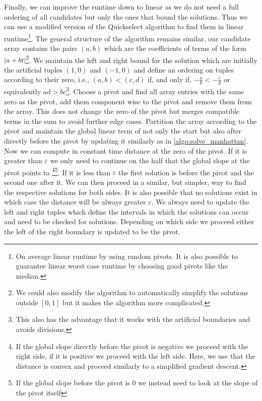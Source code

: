 Finally, we can improve the runtime down to linear as we do not need a full ordering of all candidates but only the ones that bound the solutions. Thus we can use a modified version of the Quickselect algorithm to find them in linear runtime\footnote{On average linear runtime by using random pivots. It is also possible to guarantee linear worst case runtime by choosing good pivots like the median.}. The general structure of the algorithm remains similar, our candidate array contains the pairs \((a, b)\) which are the coefficients of terms of the form \(|a+bt|\)\footnote{We could also modify the algorithm to automatically simplify the solutions outside \([0,1]\) but it makes the algorithm more complicated.}. 
We maintain the left and right bound for the solution which are initially the artificial tuples \((1, 0)\) and \((-1, 0)\) and define an ordering on tuples according to their zero, i.e., \((a, b) < (c,d)\) if, and only if, \(-\frac ab < -\frac cd\) or equivalently \(ad > bc\)\footnote{This also has the advantage that it works with the artificial boundaries and avoids divisions.}. 
Choose a pivot and find all array entries with the same zero as the pivot, add them component wise to the pivot and remove them from the array. This does not change the zero of the pivot but merges compatible terms in the sum to avoid further edge cases. Partition the array according to the pivot and maintain the global linear term of not only the start but also after directly before the pivot by updating it similarly as in \cref{algo:solve_manhattan}. Now we can compute in constant time distance at the zero of the pivot. If it is greater than \(\varepsilon\) we only need to continue on the half that the global slope at the pivot points to \footnote{If the global slope directly before the pivot is negative we proceed with the right side, if it is positive we proceed with the left side. Here, we use that the distance is convex and proceed similarly to a simplified gradient descent. }\footnote{If the global slope before the pivot is 0 we instead need to look at the slope of the pivot itself}. If it is less than \(\varepsilon\) the first solution is before the pivot and the second one after it. We can then proceed in a similar, but simpler, way to find the respective solutions for both sides. It is also possible that no solutions exist in which case the distance will be always greater \(\varepsilon\). We always need to update the left and right tuples which define the intervals in which the solutions can occur and need to be checked for solutions. Depending on which side we proceed either the left of the right boundary is updated to be the pivot.

